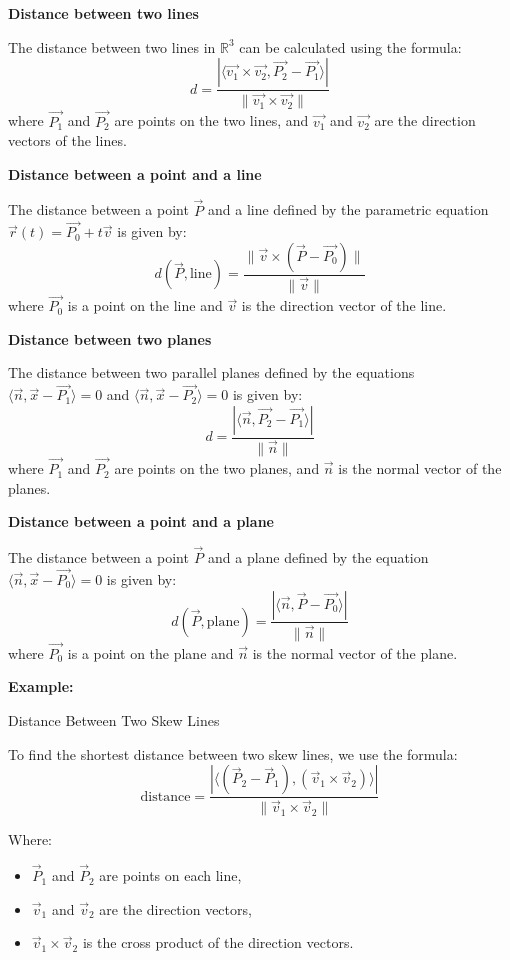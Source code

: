 \textbf{Distance between two lines}

The distance between two lines in \(\mathbb{R}^3\) can be calculated using the formula:
\[
	d = \frac{|\langle \vec{v_1} \times \vec{v_2}, \vec{P_2} - \vec{P_1} \rangle|}{\|\vec{v_1} \times \vec{v_2}\|}
\]
where \(\vec{P_1}\) and \(\vec{P_2}\) are points on the two lines, and \(\vec{v_1}\) and \(\vec{v_2}\) are the direction vectors of the lines.

\textbf{Distance between a point and a line}

The distance between a point \(\vec{P}\) and a line defined by the parametric equation \(\vec{r}(t) = \vec{P_0} + t\vec{v}\) is given by:
\[
	d(\vec{P}, \text{line}) = \frac{\|\vec{v} \times (\vec{P} - \vec{P_0})\|}{\|\vec{v}\|}
\]
where \(\vec{P_0}\) is a point on the line and \(\vec{v}\) is the direction vector of the line.

\textbf{Distance between two planes}

The distance between two parallel planes defined by the equations \(\langle \vec{n}, \vec{x} - \vec{P_1} \rangle = 0\) and \(\langle \vec{n}, \vec{x} - \vec{P_2} \rangle = 0\) is given by:
\[
	d = \frac{|\langle \vec{n}, \vec{P_2} - \vec{P_1} \rangle|}{\|\vec{n}\|}
\]
where \(\vec{P_1}\) and \(\vec{P_2}\) are points on the two planes, and \(\vec{n}\) is the normal vector of the planes.

\textbf{Distance between a point and a plane}

The distance between a point \(\vec{P}\) and a plane defined by the equation \(\langle \vec{n}, \vec{x} - \vec{P_0} \rangle = 0\) is given by:
\[
	d(\vec{P}, \text{plane}) = \frac{|\langle \vec{n}, \vec{P} - \vec{P_0} \rangle|}{\|\vec{n}\|}
\]
where \(\vec{P_0}\) is a point on the plane and \(\vec{n}\) is the normal vector of the plane.

\textbf{Example:} 

Distance Between Two Skew Lines

To find the shortest distance between two skew lines, we use the formula:
\[
	\text{distance} = \frac{|\langle(\vec{P}_2 - \vec{P}_1), (\vec{v}_1 \times \vec{v}_2)\rangle|}{\|\vec{v}_1 \times \vec{v}_2\|}
\]

Where:
\begin{itemize}[label=\(-\)]
	\item \(\vec{P}_1\) and \(\vec{P}_2\) are points on each line,
	\item \(\vec{v}_1\) and \(\vec{v}_2\) are the direction vectors,
	\item \(\vec{v}_1 \times \vec{v}_2\) is the cross product of the direction vectors.
\end{itemize}

